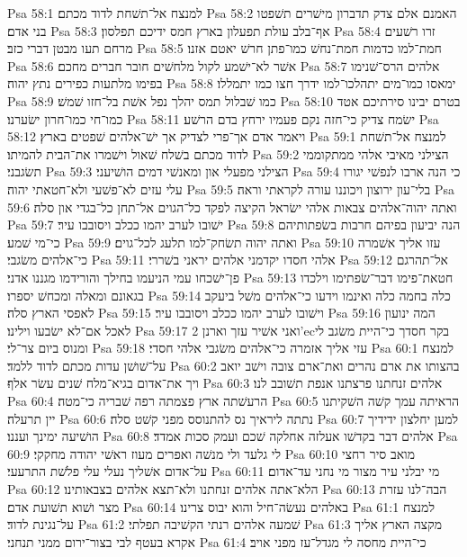 Psa 58:1  למנצח אל־תשׁחת לדוד מכתם׃
Psa 58:2  האמנם אלם צדק תדברון מישׁרים תשׁפטו בני אדם׃
Psa 58:3  אף־בלב עולת תפעלון בארץ חמס ידיכם תפלסון׃
Psa 58:4  זרו רשׁעים מרחם תעו מבטן דברי כזב׃
Psa 58:5  חמת־למו כדמות חמת־נחשׁ כמו־פתן חרשׁ יאטם אזנו׃
Psa 58:6  אשׁר לא־ישׁמע לקול מלחשׁים חובר חברים מחכם׃
Psa 58:7  אלהים הרס־שׁנימו בפימו מלתעות כפירים נתץ יהוה׃
Psa 58:8  ימאסו כמו־מים יתהלכו־למו ידרך חצו כמו יתמללו׃
Psa 58:9  כמו שׁבלול תמס יהלך נפל אשׁת בל־חזו שׁמשׁ׃
Psa 58:10  בטרם יבינו סירתיכם אטד כמו־חי כמו־חרון ישׂערנו׃
Psa 58:11  ישׂמח צדיק כי־חזה נקם פעמיו ירחץ בדם הרשׁע׃
Psa 58:12  ויאמר אדם אך־פרי לצדיק אך ישׁ־אלהים שׁפטים בארץ׃
Psa 59:1  למנצח אל־תשׁחת לדוד מכתם בשׁלח שׁאול וישׁמרו את־הבית להמיתו׃
Psa 59:2  הצילני מאיבי אלהי ממתקוממי תשׂגבני׃
Psa 59:3  הצילני מפעלי און ומאנשׁי דמים הושׁיעני׃
Psa 59:4  כי הנה ארבו לנפשׁי יגורו עלי עזים לא־פשׁעי ולא־חטאתי יהוה׃
Psa 59:5  בלי־עון ירוצון ויכוננו עורה לקראתי וראה׃
Psa 59:6  ואתה יהוה־אלהים צבאות אלהי ישׂראל הקיצה לפקד כל־הגוים אל־תחן כל־בגדי און סלה׃
Psa 59:7  ישׁובו לערב יהמו ככלב ויסובבו עיר׃
Psa 59:8  הנה יביעון בפיהם חרבות בשׂפתותיהם כי־מי שׁמע׃
Psa 59:9  ואתה יהוה תשׂחק־למו תלעג לכל־גוים׃
Psa 59:10  עזו אליך אשׁמרה כי־אלהים משׂגבי׃
Psa 59:11  אלהי חסדו יקדמני אלהים יראני בשׁררי׃
Psa 59:12  אל־תהרגם פן־ישׁכחו עמי הניעמו בחילך והורידמו מגננו אדני׃
Psa 59:13  חטאת־פימו דבר־שׂפתימו וילכדו בגאונם ומאלה ומכחשׁ יספרו׃
Psa 59:14  כלה בחמה כלה ואינמו וידעו כי־אלהים משׁל ביעקב לאפסי הארץ סלה׃
Psa 59:15  וישׁובו לערב יהמו ככלב ויסובבו עיר׃
Psa 59:16  המה ינועון לאכל אם־לא ישׂבעו וילינו׃
Psa 59:17  ואני אשׁיר עזך וארנן 2'ecבקר חסדך כי־היית משׂגב לי ומנוס ביום צר־לי׃
Psa 59:18  עזי אליך אזמרה כי־אלהים משׂגבי אלהי חסדי׃
Psa 60:1  למנצח על־שׁושׁן עדות מכתם לדוד ללמד׃
Psa 60:2  בהצותו את ארם נהרים ואת־ארם צובה וישׁב יואב ויך את־אדום בגיא־מלח שׁנים עשׂר אלף׃
Psa 60:3  אלהים זנחתנו פרצתנו אנפת תשׁובב לנו׃
Psa 60:4  הרעשׁתה ארץ פצמתה רפה שׁבריה כי־מטה׃
Psa 60:5  הראיתה עמך קשׁה השׁקיתנו יין תרעלה׃
Psa 60:6  נתתה ליראיך נס להתנוסס מפני קשׁט סלה׃
Psa 60:7  למען יחלצון ידידיך הושׁיעה ימינך ועננו׃
Psa 60:8  אלהים דבר בקדשׁו אעלזה אחלקה שׁכם ועמק סכות אמדד׃
Psa 60:9  לי גלעד ולי מנשׁה ואפרים מעוז ראשׁי יהודה מחקקי׃
Psa 60:10  מואב סיר רחצי על־אדום אשׁליך נעלי עלי פלשׁת התרעעי׃
Psa 60:11  מי יבלני עיר מצור מי נחני עד־אדום׃
Psa 60:12  הלא־אתה אלהים זנחתנו ולא־תצא אלהים בצבאותינו׃
Psa 60:13  הבה־לנו עזרת מצר ושׁוא תשׁועת אדם׃
Psa 60:14  באלהים נעשׂה־חיל והוא יבוס צרינו׃
Psa 61:1  למנצח על־נגינת לדוד׃
Psa 61:2  שׁמעה אלהים רנתי הקשׁיבה תפלתי׃
Psa 61:3  מקצה הארץ אליך אקרא בעטף לבי בצור־ירום ממני תנחני׃
Psa 61:4  כי־היית מחסה לי מגדל־עז מפני אויב׃

